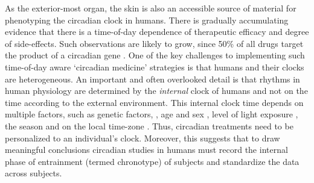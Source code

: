 As the exterior-most organ, the skin is also an accessible source of material for phenotyping the circadian clock in humans. There is gradually accumulating evidence that there is a time-of-day dependence of therapeutic efficacy and degree of side-effects\cite{Montaigne2018,Dallmann2016,Long2016}. Such observations are likely to grow, since 50\% of all drugs target the product of a circadian gene \cite{Ruben2018, Zhang2014}. One of the key challenges to implementing such time-of-day aware `circadian medicine' strategies is that humans and their clocks are heterogeneous. An important and often overlooked detail is that rhythms in human physiology are determined by the \textit{internal} clock of humans and not on the time according to the external environment. This internal clock time depends on multiple factors, such as genetic factors, \cite{Hsu2015, Brown2008}, age and sex \cite{Roenneberg2007}, level of light exposure \cite{Stothard2017, Wright2013}, the season \cite{Stothard2017, Allebrandt2014} and on the local time-zone \cite{Roenneberg2007}. Thus, circadian treatments need to be personalized to an individual's clock. Moreover, this suggests that to draw meaningful conclusions circadian studies in humans must record the internal phase of entrainment (termed chronotype) of subjects and standardize the data across subjects. 

